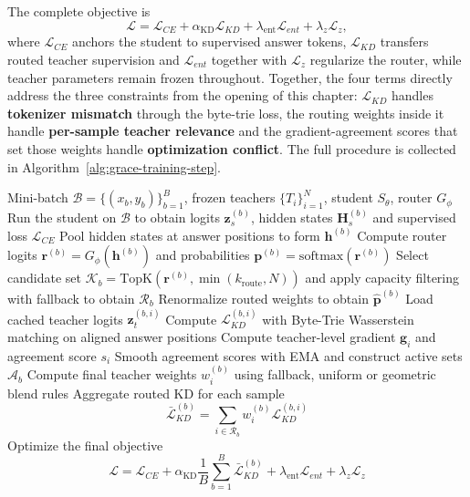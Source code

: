 \FloatBarrier

The complete \methodname{} objective is
\begin{equation}
\mathcal{L}
=
\mathcal{L}_{CE}
+
\alpha_{\mathrm{KD}}\mathcal{L}_{KD}
+
\lambda_{\mathrm{ent}}\mathcal{L}_{ent}
+
\lambda_{z}\mathcal{L}_{z},
\label{eq:final-objective}
\end{equation}
where $\mathcal{L}_{CE}$ anchors the student to supervised answer tokens,
$\mathcal{L}_{KD}$ transfers routed teacher supervision and $\mathcal{L}_{ent}$
together with $\mathcal{L}_{z}$ regularize the router, while teacher parameters
remain frozen throughout. Together, the four terms directly address
the three constraints from the opening of this chapter: $\mathcal{L}_{KD}$
handles \textbf{tokenizer mismatch} through the byte-trie loss, the routing weights
inside it handle \textbf{per-sample teacher relevance} and the gradient-agreement
scores that set those weights handle \textbf{optimization conflict}.
The full procedure is collected in Algorithm~\ref{alg:grace-training-step}.

\begin{algorithm}[H]
\caption{One GRACE training step}
\label{alg:grace-training-step}
\begin{algorithmic}[1]
\Require Mini-batch \(\mathcal{B}=\{(x_b,y_b)\}_{b=1}^{B}\), frozen teachers
\(\{T_i\}_{i=1}^{N}\), student \(S_\theta\), router \(G_\phi\)
\State Run the student on \(\mathcal{B}\) to obtain logits
\(\mathbf{z}_s^{(b)}\), hidden states \(\mathbf{H}_s^{(b)}\) and supervised
loss \(\mathcal{L}_{CE}\)
    \State Pool hidden states at answer positions to form \(\mathbf{h}^{(b)}\)
    \State Compute router logits
    \(\mathbf{r}^{(b)}=G_\phi(\mathbf{h}^{(b)})\) and probabilities
    \(\mathbf{p}^{(b)}=\mathrm{softmax}(\mathbf{r}^{(b)})\)
    \State Select candidate set
    \(\mathcal{K}_b=\mathrm{TopK}(\mathbf{r}^{(b)},\min(k_{\mathrm{route}},N))\)
    and apply capacity filtering with fallback to obtain \(\mathcal{R}_b\)
    \State Renormalize routed weights to obtain \(\hat{\mathbf{p}}^{(b)}\)
\EndFor
{}
    \State Load cached teacher logits \(\mathbf{z}_t^{(b,i)}\)
    \State Compute \(\mathcal{L}_{KD}^{(b,i)}\) with Byte-Trie Wasserstein
    matching on aligned answer positions
    \State Compute teacher-level gradient \(\mathbf{g}_i\) and agreement score
    \(s_i\)
\EndFor
\State Smooth agreement scores with EMA and construct active sets
\(\mathcal{A}_b\)
\State Compute final teacher weights \(w_i^{(b)}\) using fallback,
uniform or geometric blend rules
\State Aggregate routed KD for each sample
\Statex \[
\bar{\mathcal{L}}_{KD}^{(b)}
=
\sum_{i\in\mathcal{R}_b}w_i^{(b)}\mathcal{L}_{KD}^{(b,i)}
\]
\State Optimize the final objective
\Statex \[
\mathcal{L}
=
\mathcal{L}_{CE}
+
\alpha_{\mathrm{KD}}\frac{1}{B}\sum_{b=1}^{B}\bar{\mathcal{L}}_{KD}^{(b)}
+
\lambda_{\mathrm{ent}}\mathcal{L}_{ent}
+
\lambda_z\mathcal{L}_z
\]
\end{algorithmic}
\end{algorithm}
